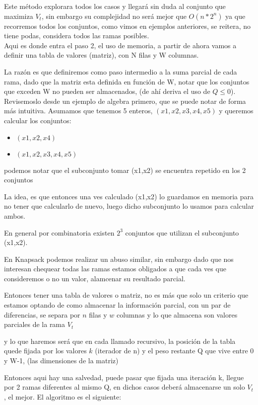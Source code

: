 \documentclass[fleqn, 11pt]{article}
\begin{document}
Este método explorara todos los casos y llegará sin duda al conjunto que maximiza \textit{$V_t$}, sin embargo su complejidad
no será mejor que $O(n * 2^n)$ ya que recorremos todos los conjuntos, como vimos en ejemplos anteriores, se reitera,
no tiene podas, considera todos las ramas posibles.\\

Aqui es donde entra el paso 2, el uso de memoria, a partir de ahora vamos a definir una tabla de valores (matriz),
con N filas y W columnas.

La razón es que definiremos como paso intermedio a la suma parcial de cada rama, dado que la matriz esta definida en
función de W, notar que los conjuntos que exceden W no pueden ser almacenados, (de ahí deriva el uso de $Q \leq 0$). \\

Revisemoslo desde un ejemplo de algebra primero, que se puede notar de forma más intuitiva. Asumamos que tenemos
5 enteros, $(x1,x2,x3,x4,x5)$ y queremos calcular los conjuntos:

\begin{itemize}
\item$(x1,x2,x4)$
\item$ (x1,x2,x3,x4,x5)$
\end{itemize}
podemos notar que el subconjunto tomar (x1,x2) se encuentra repetido en los 2 conjuntos

La idea, es que entonces una ves calculado (x1,x2) lo guardamos en memoria para no tener que calcularlo de nuevo,
luego dicho subconjunto lo usamos para calcular ambos.

En general por combinatoria existen $2^3$ conjuntos que utilizan el subconjunto (x1,x2).

En Knapsack podemos realizar un abuso similar, sin embargo dado que nos interesan chequear todas las ramas estamos
obligados a que cada ves que consideremos o no un valor, alamcenar su resultado parcial.

Entonces tener una tabla de valores o matriz, no es más que solo un criterio que estamos optando de como almacenar
la información parcial, con un par de diferencias, se separa por $n$ filas y $w$ columnas y lo que almacena
son valores parciales de la rama \textit{$V_t$}

y lo que haremos será que en cada llamado recursivo, la posición de la tabla quede fijada por los valores $k$
(iterador de n) y el peso restante Q que vive entre 0 y W-1, (las dimensiones de la matriz)

Entonces aqui hay una salvedad, puede pasar que fijada una iteración k, llegue por 2 ramas diferentes al mismo Q,
en dichos casos deberá almacenarse un solo \textit{$V_t$}, el mejor. El algoritmo es el siguiente: \\
\end{document}
